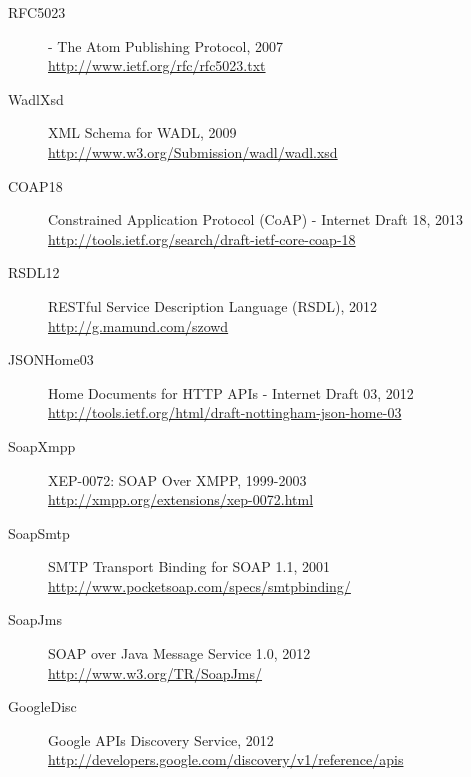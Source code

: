 \documentclass{wsrest2014}
\begin{document}
\begin{description}
 \item[RFC5023] \label{RFC5023}\hypertarget{RFC5023}{} - The Atom Publishing Protocol, 2007 \\\href{http://www.ietf.org/rfc/rfc5023.txt}{http://www.ietf.org/rfc/rfc5023.txt}


 \item[WadlXsd] \label{WadlXsd}\hypertarget{WadlXsd}{} XML Schema for WADL, 2009 \\\href{http://www.w3.org/Submission/wadl/wadl.xsd}{http://www.w3.org/Submission/wadl/wadl.xsd}


 \item[COAP18] \label{COAP18}\hypertarget{COAP18}{} Constrained Application Protocol (CoAP) - Internet Draft 18, 2013 \\\href{http://tools.ietf.org/search/draft-ietf-core-coap-18}{http://tools.ietf.org/search/draft-ietf-core-coap-18}


 \item[RSDL12] \label{RSDL12}\hypertarget{RSDL12}{} RESTful Service Description Language (RSDL), 2012 \\\href{http://g.mamund.com/szowd}{http://g.mamund.com/szowd}


 \item[JSONHome03] \label{JSONHome03}\hypertarget{JSONHome03}{} Home Documents for HTTP APIs - Internet Draft 03, 2012 \\\href{http://tools.ietf.org/html/draft-nottingham-json-home-03}{http://tools.ietf.org/html/draft-nottingham-json-home-03}


 \item[SoapXmpp] \label{SoapXmpp}\hypertarget{SoapXmpp}{} XEP-0072: SOAP Over XMPP, 1999-2003 \\\href{http://xmpp.org/extensions/xep-0072.html}{http://xmpp.org/extensions/xep-0072.html}


 \item[SoapSmtp] \label{SoapSmtp}\hypertarget{SoapSmtp}{} SMTP Transport Binding for SOAP 1.1, 2001 \\\href{http://www.pocketsoap.com/specs/smtpbinding/}{http://www.pocketsoap.com/specs/smtpbinding/}


 \item[SoapJms] \label{SoapJms}\hypertarget{SoapJms}{} SOAP over Java Message Service 1.0, 2012 \\\href{http://www.w3.org/TR/SoapJms/}{http://www.w3.org/TR/SoapJms/}

 \item[GoogleDisc] \label{GoogleDisc}\hypertarget{GoogleDisc}{} Google APIs Discovery Service, 2012 \\\href{https://developers.google.com/discovery/v1/reference/apis}{http://developers.google.com/discovery/v1/reference/apis}


\end{description}
\end{document}
